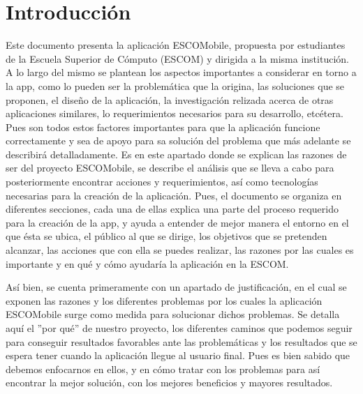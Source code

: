 \section{Introducción}

\noindent
Este documento presenta la aplicación ESCOMobile, propuesta por estudiantes de la Escuela Superior de Cómputo (ESCOM) y dirigida a la misma institución. A lo largo del mismo se plantean los aspectos importantes a considerar en torno a la app, como lo pueden ser la problemática que la origina, las soluciones que se proponen, el diseño de la aplicación, la investigación relizada acerca de otras aplicaciones similares, lo requerimientos necesarios para su desarrollo, etcétera. Pues son todos estos factores importantes para que la aplicación funcione correctamente y sea de apoyo para sa solución del problema que más adelante se describirá detalladamente. 
Es en este apartado donde se explican las razones de ser del proyecto ESCOMobile, se describe el análisis que se lleva a cabo para posteriormente encontrar acciones y requerimientos, así como tecnologías necesarias para la creación de la aplicación. Pues, el documento se organiza en diferentes secciones, cada una de ellas explica una parte del proceso requerido para la creación de la app, y ayuda a entender de mejor manera el entorno en el que ésta se ubica, el público al que se dirige, los objetivos que se pretenden alcanzar, las acciones que con ella se puedes realizar, las razones por las cuales es importante y en qué y cómo ayudaría la aplicación en la ESCOM. 

\noindent
Así bien, se cuenta primeramente con un apartado de justificación, en el cual se exponen las razones y los diferentes problemas por los cuales la aplicación ESCOMobile surge como medida para solucionar dichos problemas. Se detalla aquí el ''por qué'' de nuestro proyecto, los diferentes caminos que podemos seguir para conseguir resultados favorables ante las problemáticas y los resultados que se espera tener cuando la aplicación llegue al usuario final. Pues es bien sabido que debemos enfocarnos en ellos, y en cómo tratar con los problemas para así encontrar la mejor solución, con los mejores beneficios y mayores resultados. 

